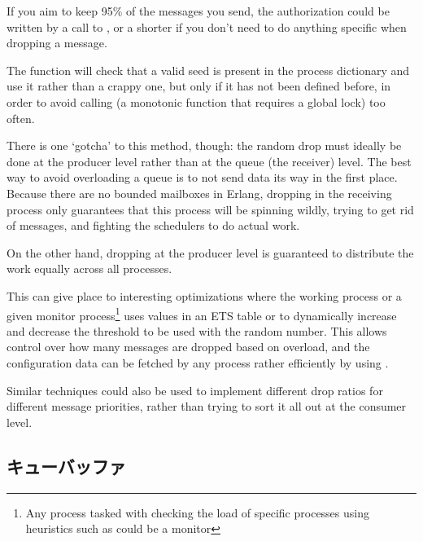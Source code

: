 
If you aim to keep 95\% of the messages you send, the authorization could be written by a call to , or a shorter  if you don't need to do anything specific when dropping a message.

The  function will check that a valid seed is present in the process dictionary and use it rather than a crappy one, but only if it has not been defined before, in order to avoid calling  (a monotonic function that requires a global lock) too often.

There is one `gotcha' to this method, though: the random drop must ideally be done at the producer level rather than at the queue (the receiver) level. The best way to avoid overloading a queue is to not send data its way in the first place. Because there are no bounded mailboxes in Erlang, dropping in the receiving process only guarantees that this process will be spinning wildly, trying to get rid of messages, and fighting the schedulers to do actual work.

On the other hand, dropping at the producer level is guaranteed to distribute the work equally across all processes.

This can give place to interesting optimizations where the working process or a given monitor process\footnote{Any process tasked with checking the load of specific processes using heuristics such as  could be a monitor} uses values in an ETS table or  to dynamically increase and decrease the threshold to be used with the random number. This allows control over how many messages are dropped based on overload, and the configuration data can be fetched by any process rather efficiently by using .

Similar techniques could also be used to implement different drop ratios for different message priorities, rather than trying to sort it all out at the consumer level.

\subsection{キューバッファ}

